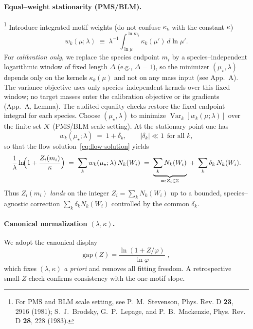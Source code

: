 \documentclass[epjc3]{svjour3}
\begin{document}
\paragraph{Equal--weight stationarity (PMS/BLM).}\footnote{For PMS and BLM scale setting, see P.~M.~Stevenson, Phys. Rev. D \textbf{23}, 2916 (1981); S.~J.~Brodsky, G.~P.~Lepage, and P.~B.~Mackenzie, Phys. Rev. D \textbf{28}, 228 (1983).}
Introduce integrated motif weights (do not confuse $\kappa_k$ with the constant $\kappa$)
\begin{equation}
  w_k(\mu;\lambda)\;\equiv\;\lambda^{-1}\!\int_{\ln\mu}^{\ln m_i}\!\kappa_k(\mu')\,d\ln\mu'.
  \label{eq:wk}
\end{equation}
For \emph{calibration only}, we replace the species endpoint $m_i$ by a species–independent logarithmic window of fixed length $\Delta$ (e.g., $\Delta=1$), so the minimizer $(\mu_\star,\lambda)$ depends only on the kernels $\kappa_k(\mu)$ and not on any mass input (see App.~A). The variance objective uses only species–independent kernels over this fixed window; no target masses enter the calibration objective or its gradients (App.~A, Lemma). The audited equality checks restore the fixed endpoint integral for each species.
Choose $(\mu_\star,\lambda)$ to minimize $\operatorname{Var}_k[w_k(\mu;\lambda)]$ over the finite set $\mathcal K$ (PMS/BLM scale setting). At the stationary point one has
\begin{equation}
  w_k(\mu_\star;\lambda)\;=\;1+\delta_k,\qquad |\delta_k|\ll 1\ \ \text{for all }k,
  \label{eq:wk-equal}
\end{equation}
so that the flow solution~\eqref{eq:flow-solution} yields
\begin{equation}
  \frac{1}{\lambda}\ln\!\Bigl(1+\frac{Z_i(m_i)}{\kappa}\Bigr)
  \;=\;\sum_k w_k(\mu_\star;\lambda)\,N_k(W_i)
  \;=\;\underbrace{\sum_k N_k(W_i)}_{=:Z_i\in\mathbb Z}\;+\;\sum_k \delta_k\,N_k(W_i).
  \label{eq:integer-landing}
\end{equation}
Thus $Z_i(m_i)$ \emph{lands} on the integer
$Z_i=\sum_k N_k(W_i)$ up to a bounded, species--agnostic correction $\sum_k\delta_k N_k(W_i)$ controlled by the common $\delta_k$.%

\paragraph{Canonical normalization $(\lambda,\kappa)$.}
We adopt the canonical display
\[
\mathrm{gap}(Z)=\frac{\ln(1+Z/\varphi)}{\ln\varphi}\,\,,
\]
which fixes $(\lambda,\kappa)$ \emph{a priori} and removes all fitting freedom. A retrospective small-$Z$ check confirms consistency with the one-motif slope.
\end{document}
